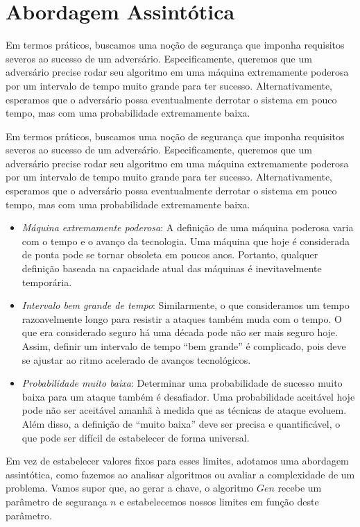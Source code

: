 \section{Abordagem Assintótica}
\label{sec:abord-assint}

Em termos práticos, buscamos uma noção de segurança que imponha requisitos severos ao sucesso de um adversário.
Especificamente, queremos que um adversário precise rodar seu algoritmo em uma máquina extremamente poderosa por um intervalo de tempo muito grande para ter sucesso.
Alternativamente, esperamos que o adversário possa eventualmente derrotar o sistema em pouco tempo, mas com uma probabilidade extremamente baixa.

Em termos práticos, buscamos uma noção de segurança que imponha requisitos severos ao sucesso de um adversário.
Especificamente, queremos que um adversário precise rodar seu algoritmo em uma máquina extremamente poderosa por um intervalo de tempo muito grande para ter sucesso.
Alternativamente, esperamos que o adversário possa eventualmente derrotar o sistema em pouco tempo, mas com uma probabilidade extremamente baixa.

\begin{itemize}
\item {\em Máquina extremamente poderosa}:
  A definição de uma máquina poderosa varia com o tempo e o avanço da tecnologia.
  Uma máquina que hoje é considerada de ponta pode se tornar obsoleta em poucos anos.
  Portanto, qualquer definição baseada na capacidade atual das máquinas é inevitavelmente temporária.

\item {\em Intervalo bem grande de tempo}:
  Similarmente, o que consideramos um tempo razoavelmente longo para resistir a ataques também muda com o tempo.
  O que era considerado seguro há uma década pode não ser mais seguro hoje.
  Assim, definir um intervalo de tempo ``bem grande'' é complicado, pois deve se ajustar ao ritmo acelerado de avanços tecnológicos.

\item {\em Probabilidade muito baixa}:
  Determinar uma probabilidade de sucesso muito baixa para um ataque também é desafiador.
  Uma probabilidade aceitável hoje pode não ser aceitável amanhã à medida que as técnicas de ataque evoluem.
  Além disso, a definição de ``muito baixa'' deve ser precisa e quantificável, o que pode ser difícil de estabelecer de forma universal.
\end{itemize}

Em vez de estabelecer valores fixos para esses limites, adotamos uma abordagem assintótica, como fazemos ao analisar algoritmos ou avaliar a complexidade de um problema.
Vamos supor que, ao gerar a chave, o algoritmo $Gen$ recebe um parâmetro de segurança $n$ e estabelecemos nossos limites em função deste parâmetro.

